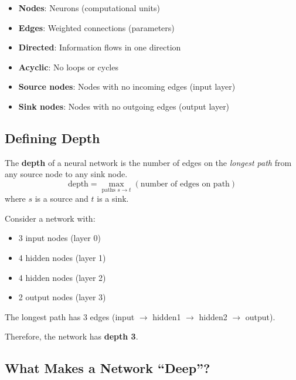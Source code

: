 \begin{itemize}
    \item \textbf{Nodes}: Neurons (computational units)
    \item \textbf{Edges}: Weighted connections (parameters)
    \item \textbf{Directed}: Information flows in one direction
    \item \textbf{Acyclic}: No loops or cycles
\end{itemize}

\begin{definitionbox}
\begin{itemize}
    \item \textbf{Source nodes}: Nodes with no incoming edges (input layer)
    \item \textbf{Sink nodes}: Nodes with no outgoing edges (output layer)
\end{itemize}
\end{definitionbox}

\subsection{Defining Depth}

\begin{definitionbox}
The \textbf{depth} of a neural network is the number of edges on the \textit{longest path} from any source node to any sink node.
\[
\text{depth} = \max_{\text{paths } s \to t} (\text{number of edges on path})
\]
where $s$ is a source and $t$ is a sink.
\end{definitionbox}

\begin{examplebox}
Consider a network with:
\begin{itemize}
    \item 3 input nodes (layer 0)
    \item 4 hidden nodes (layer 1)
    \item 4 hidden nodes (layer 2)
    \item 2 output nodes (layer 3)
\end{itemize}

The longest path has $3$ edges (input $\to$ hidden1 $\to$ hidden2 $\to$ output).

Therefore, the network has \textbf{depth 3}.
\end{examplebox}

\subsection{What Makes a Network ``Deep''?}

